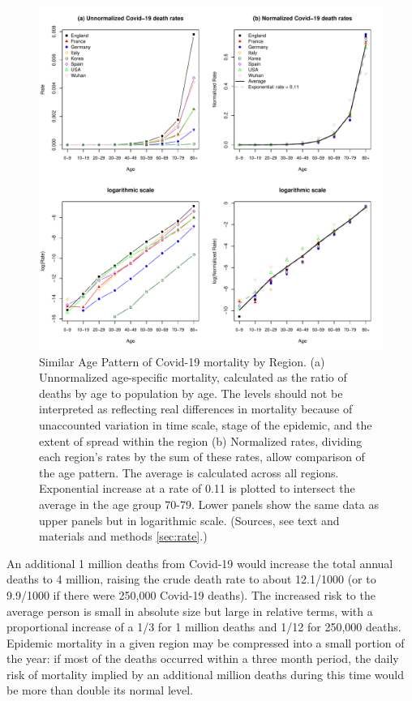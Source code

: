 \documentclass[9pt,twocolumn,twoside,lineno]{pnas-new}
\begin{document}
\begin{figure}[h]%
\centering
\includegraphics[width=.8\linewidth]{fig1_age_specific_covid_rates}
\caption{Similar Age Pattern of Covid-19 mortality by Region. (a)
  Unnormalized age-specific mortality, calculated as the ratio of
  deaths by age to population by age. The levels should not be
  interpreted as reflecting real differences in mortality because of
  unaccounted variation in time scale, stage of the epidemic, and the
  extent of spread within the region (b) Normalized rates, dividing
  each region's rates by the sum of these rates, allow comparison of
  the age pattern. The average is calculated across all
  regions. Exponential increase at a rate of 0.11 is plotted to
  intersect the average in the age group 70-79. Lower panels show the
  same data as upper panels but in logarithmic scale. (Sources, see
  text and materials and methods \ref{sec:rate}.)}
\label{fig:asmr}
\end{figure}

An additional 1 million deaths from Covid-19 would increase the total
annual deaths to 4 million, raising the crude death rate to about
12.1/1000 (or to 9.9/1000 if there were 250,000 Covid-19 deaths). The
increased risk to the average person is small in absolute size but
large in relative terms, with a proportional increase of a 1/3 for 1
million deaths and 1/12 for 250,000 deaths.  Epidemic mortality in a
given region may be compressed into a small portion of the year: if
most of the deaths occurred within a three month period, the daily
risk of mortality implied by an additional million deaths during this
time would be more than double its normal level.
\end{document}
